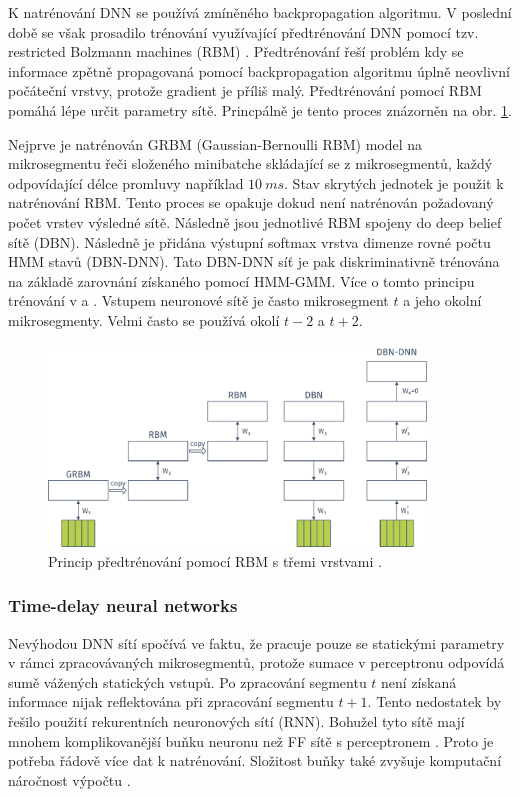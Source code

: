 K natrénování DNN se používá zmíněného backpropagation algoritmu. V poslední době se však prosadilo trénování využívající předtrénování DNN pomocí tzv. restricted Bolzmann machines (RBM) \cite{Hinton2012}. Předtrénování řeší problém kdy se informace zpětně propagovaná pomocí backpropagation algoritmu úplně neovlivní počáteční vrstvy, protože gradient je příliš malý. Předtrénování pomocí RBM pomáhá lépe určit parametry sítě. Princpálně je tento proces znázorněn na obr. \ref{fig:asr:acoustic:dnn:pretraining}.

Nejprve je natrénován GRBM (Gaussian-Bernoulli RBM) model na mikrosegmentu řeči složeného minibatche skládající se z mikrosegmentů, každý odpovídající délce promluvy například $10\ ms$. Stav skrytých jednotek je použit k natrénování RBM. Tento proces se opakuje dokud není natrénován požadovaný počet vrstev výsledné sítě. Následně jsou jednotlivé RBM spojeny do deep belief sítě (DBN). Následně je přidána výstupní softmax vrstva dimenze rovné počtu HMM stavů (DBN-DNN). Tato DBN-DNN síť je pak diskriminativně trénována na základě zarovnání získaného pomocí HMM-GMM. Více o tomto principu trénování v \cite{Hinton2012} a \cite{Vesely2013}. Vstupem neuronové sítě je často mikrosegment $t$ a jeho okolní mikrosegmenty. Velmi často se používá okolí $t-2$ a $t+2$.

\begin{figure}[hbpt]
  \centering
  \includegraphics[width=0.9\textwidth]{./ch4-asr/img/pretraining.pdf}
  \caption{Princip předtrénování pomocí RBM s třemi vrstvami \cite{Hinton2012}.}
  \label{fig:asr:acoustic:dnn:pretraining}
\end{figure}

\subsubsection{Time-delay neural networks}

Nevýhodou DNN sítí spočívá ve faktu, že pracuje pouze se statickými parametry v rámci zpracovávaných mikrosegmentů, protože sumace v perceptronu odpovídá sumě vážených statických vstupů. Po zpracování segmentu $t$ není získaná informace nijak reflektována při zpracování segmentu $t+1$. Tento nedostatek by řešilo použití rekurentních neuronových sítí (RNN). Bohužel tyto sítě mají mnohem komplikovanější buňku neuronu než FF sítě s perceptronem \cite{Amodei2016}. Proto je potřeba řádově více dat k natrénování. Složitost buňky také zvyšuje komputační náročnost výpočtu \cite{Hannun2014}.


